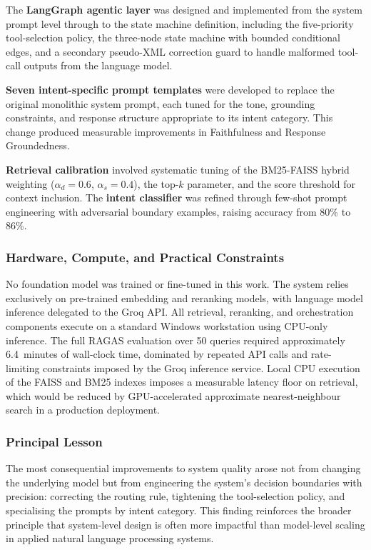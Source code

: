 \documentclass[conference]{IEEEtran}
\begin{document}
The \textbf{LangGraph agentic layer} was designed and implemented from the system
prompt level through to the state machine definition, including the five-priority
tool-selection policy, the three-node state machine with bounded conditional edges,
and a secondary pseudo-XML correction guard to handle malformed tool-call outputs
from the language model.

\textbf{Seven intent-specific prompt templates} were developed to replace the
original monolithic system prompt, each tuned for the tone, grounding constraints,
and response structure appropriate to its intent category. This change produced
measurable improvements in Faithfulness and Response Groundedness.

\textbf{Retrieval calibration} involved systematic tuning of the BM25-FAISS
hybrid weighting ($\alpha_d = 0.6$, $\alpha_s = 0.4$), the top-$k$ parameter,
and the score threshold for context inclusion. The \textbf{intent classifier}
was refined through few-shot prompt engineering with adversarial boundary examples,
raising accuracy from 80\% to 86\%.

\subsubsection*{Hardware, Compute, and Practical Constraints}
No foundation model was trained or fine-tuned in this work. The system relies
exclusively on pre-trained embedding and reranking models, with language model
inference delegated to the Groq API. All retrieval, reranking, and orchestration
components execute on a standard Windows workstation using CPU-only inference.
The full RAGAS evaluation over 50 queries required approximately 6.4~minutes of
wall-clock time, dominated by repeated API calls and rate-limiting constraints
imposed by the Groq inference service. Local CPU execution of the FAISS and BM25
indexes imposes a measurable latency floor on retrieval, which would be reduced
by GPU-accelerated approximate nearest-neighbour search in a production deployment.

\subsubsection*{Principal Lesson}
The most consequential improvements to system quality arose not from changing the
underlying model but from engineering the system's decision boundaries with
precision: correcting the routing rule, tightening the tool-selection policy, and
specialising the prompts by intent category. This finding reinforces the broader
principle that system-level design is often more impactful than model-level
scaling in applied natural language processing systems.
\end{document}
